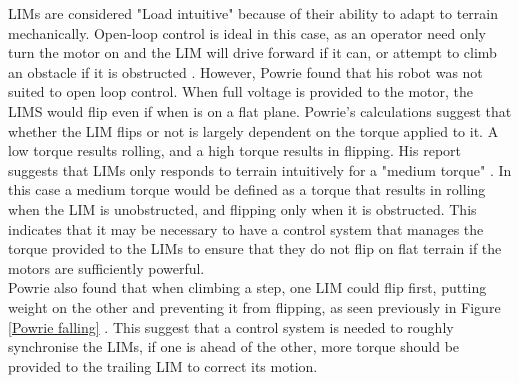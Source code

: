 LIMs are considered "Load intuitive" because of their ability to adapt to terrain mechanically. Open-loop control is ideal in this case, as an operator need only turn the motor on and the LIM will drive forward if it can, or attempt to climb an obstacle if it is obstructed \citep{Wilson-2013}. However, Powrie found that his robot was not suited to open loop control. When full voltage is provided to the motor, the LIMS would flip even if when is on a flat plane. Powrie's calculations suggest that whether the LIM flips or not is largely dependent on the torque applied to it. A low torque results rolling, and a high torque results in flipping. His report suggests that LIMs only responds to terrain intuitively for a "medium torque" \citep{Powrie-2019}. In this case a medium torque would be defined as a torque that results in rolling when the LIM is unobstructed, and flipping only when it is obstructed. This indicates that it may be necessary to have a control system that manages the torque provided to the LIMs to ensure that they do not flip on flat terrain if the motors are sufficiently powerful.\\

Powrie also found that when climbing a step, one LIM could flip first, putting weight on the other and preventing it from flipping, as seen previously in Figure \ref{Powrie falling} \citep{Powrie-2019}. This suggest that a control system is needed to roughly synchronise the LIMs, if one is ahead of the other, more torque should be provided to the trailing LIM to correct its motion.